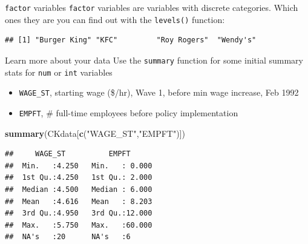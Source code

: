\documentclass[
  ignorenonframetext,
]{beamer}
\newenvironment{Shaded}{\begin{snugshade}}{\end{snugshade}}
\newcommand{\FunctionTok}[1]{\textcolor[rgb]{0.13,0.29,0.53}{\textbf{#1}}}
\newcommand{\NormalTok}[1]{#1}
\newcommand{\SpecialCharTok}[1]{\textcolor[rgb]{0.81,0.36,0.00}{\textbf{#1}}}
\newcommand{\StringTok}[1]{\textcolor[rgb]{0.31,0.60,0.02}{#1}}
\providecommand{\tightlist}{%
  \setlength{\itemsep}{0pt}\setlength{\parskip}{0pt}}
\begin{document}
\begin{frame}[fragile]{\texttt{factor} variables}
\label{variables-2}
\texttt{factor} variables are variables with discrete categories. Which
ones they are you can find out with the \texttt{levels()} function:

\begin{Shaded}
\end{Shaded}

\begin{verbatim}
## [1] "Burger King" "KFC"         "Roy Rogers"  "Wendy's"
\end{verbatim}
\end{frame}

\begin{frame}[fragile]{Learn more about your data}
\label{learn-more-about-your-data}
Use the \texttt{summary} function for some initial summary stats for
\texttt{num} or \texttt{int} variables

\begin{itemize}
\tightlist
\item
  \texttt{WAGE\_ST}, starting wage (\$/hr), Wave 1, before min wage
  increase, Feb 1992
\item
  \texttt{EMPFT}, \# full-time employees before policy implementation
\end{itemize}

\footnotesize

\begin{Shaded}
\begin{Highlighting}[]
\FunctionTok{summary}\NormalTok{(CKdata[}\FunctionTok{c}\NormalTok{(}\StringTok{"WAGE\_ST"}\NormalTok{,}\StringTok{"EMPFT"}\NormalTok{)])}
\end{Highlighting}
\end{Shaded}

\begin{verbatim}
##     WAGE_ST          EMPFT       
##  Min.   :4.250   Min.   : 0.000  
##  1st Qu.:4.250   1st Qu.: 2.000  
##  Median :4.500   Median : 6.000  
##  Mean   :4.616   Mean   : 8.203  
##  3rd Qu.:4.950   3rd Qu.:12.000  
##  Max.   :5.750   Max.   :60.000  
##  NA's   :20      NA's   :6
\end{verbatim}

\normalsize
\end{frame}
\end{document}
